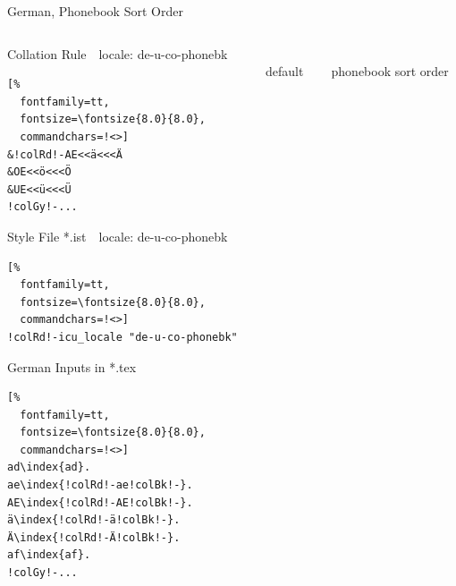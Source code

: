 \documentclass[aspectratio=169,10pt]{beamer}
\begin{document}

\setmonofont{Noto Sans Mono}
\begin{frame}[fragile]{German, Phonebook Sort Order}

\begin{columns}
\begin{column}{55mm}

\setmonofont{Noto Sans Mono}
\begin{block}{Collation Rule~~\scriptsize locale: de-u-co-phonebk}
\begin{Verbatim}[%
  fontfamily=tt,
  fontsize=\fontsize{8.0}{8.0},
  commandchars=!<>]
&!colRd!-AE<<ä<<<Ä
&OE<<ö<<<Ö
&UE<<ü<<<Ü
!colGy!-...
\end{Verbatim}
\end{block}
\begin{exampleblock}{Style File *.ist~~\scriptsize locale: de-u-co-phonebk}
\begin{Verbatim}[%
  fontfamily=tt,
  fontsize=\fontsize{8.0}{8.0},
  commandchars=!<>]
!colRd!-icu_locale "de-u-co-phonebk"
\end{Verbatim}
\end{exampleblock}
\begin{exampleblock}{German Inputs in *.tex}
\begin{Verbatim}[%
  fontfamily=tt,
  fontsize=\fontsize{8.0}{8.0},
  commandchars=!<>]
ad\index{ad}.
ae\index{!colRd!-ae!colBk!-}.
AE\index{!colRd!-AE!colBk!-}.
ä\index{!colRd!-ä!colBk!-}.
Ä\index{!colRd!-Ä!colBk!-}.
af\index{af}.
!colGy!-...
\end{Verbatim}
\end{exampleblock}
\end{column}

\begin{column}{38mm}
\begin{center}
\\[2mm]%
default
\end{center}
\end{column}

\begin{column}{38mm}
\begin{center}
\\[2mm]%
phonebook sort order
\end{center}
\end{column}
\end{columns}

\end{frame}
\end{document}
